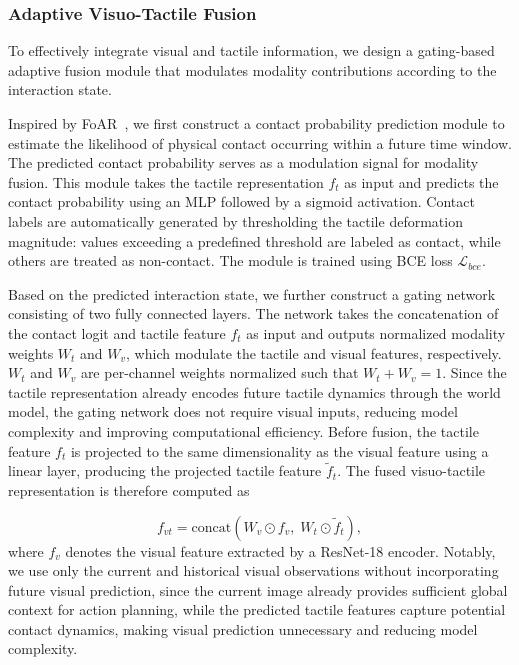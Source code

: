 \subsubsection{Adaptive Visuo-Tactile Fusion}

To effectively integrate visual and tactile information, we design a gating-based adaptive fusion module that modulates modality contributions according to the interaction state.

Inspired by FoAR~\cite{he2025foar}, we first construct a contact probability prediction module to estimate the likelihood of physical contact occurring within a future time window. The predicted contact probability serves as a modulation signal for modality fusion. This module takes the tactile representation $f_t$ as input and predicts the contact probability using an MLP followed by a sigmoid activation. Contact labels are automatically generated by thresholding the tactile deformation magnitude: values exceeding a predefined threshold are labeled as contact, while others are treated as non-contact. The module is trained using BCE loss $\mathcal{L}_{bce}$.

Based on the predicted interaction state, we further construct a gating network consisting of two fully connected layers. The network takes the concatenation of the contact logit and tactile feature $f_t$ as input and outputs normalized modality weights $W_t$ and $W_v$, which modulate the tactile and visual features, respectively. $W_t$ and $W_v$ are per-channel weights normalized such that $W_t + W_v = 1$. Since the tactile representation already encodes future tactile dynamics through the world model, the gating network does not require visual inputs, reducing model complexity and improving computational efficiency. Before fusion, the tactile feature $f_t$ is projected to the same dimensionality as the visual feature using a linear layer, producing the projected tactile feature $\tilde{f}_t$. The fused visuo-tactile representation is therefore computed as

\begin{equation}
f_{vt} = \text{concat}\left(W_v \odot f_v,\; W_t \odot \tilde{f}_t \right),
\end{equation}
where $f_v$ denotes the visual feature extracted by a ResNet-18 encoder. Notably, we use only the current and historical visual observations without incorporating future visual prediction, since the current image already provides sufficient global context for action planning, while the predicted tactile features capture potential contact dynamics, making visual prediction unnecessary and reducing model complexity.

